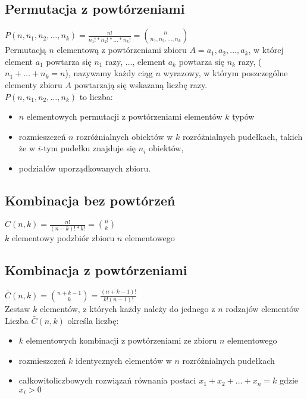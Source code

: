 \documentclass[a4paper,12pt]{article}
\begin{document}
\subsection{Permutacja z powtórzeniami} $P(n,n_1,n_2,\dots ,n_k)=\frac{n!}{n_1!*n_2!*\dots *n_k!}= {{n}\choose{n_1,n_2,\dots, n_k}}$ \\
Permutacją $n$ elementową z powtórzeniami zbioru  $A=a_1,a_2,\dots,a_k$, w której element $a_1$ powtarza się $n_1$ razy, $\dots$, element $a_k$ powtarza się $n_k$ razy, ($n_1+ \dots + n_k= n$), nazywamy każdy ciąg $n$ wyrazowy, w którym poszczególne elementy zbioru $A$ powtarzają się wskazaną liczbę razy.\\

$P(n,n_1,n_2,\dots ,n_k)$ to liczba: 
\begin{itemize} \itemsep1pt \parskip0pt 
 \item $n$ elementowych permutacji z powtórzeniami elementów $k$ typów
 \item rozmieszczeń $n$ rozróżnialnych obiektów w $k$ rozróżnialnych pudełkach, takich że w $i$-tym pudełku znajduje się $n_i$ obiektów,
 \item podziałów uporządkowanych zbioru.
\end{itemize}
\subsection{Kombinacja bez powtórzeń} $C(n,k)=\frac{n!}{(n-k)!*k!}={{n}\choose{k}}$ \\
$k$ elementowy podzbiór zbioru $n$ elementowego 
\subsection{Kombinacja z powtórzeniami} $\bar C(n,k)={{n+k-1}\choose{k}}=\frac{(n+k-1)!}{k!(n-1)!}$ \\
Zestaw $k$ elementów, z których każdy należy do jednego z $n$ rodzajów elementów
Liczba $\bar C(n,k)$ określa liczbę:
\begin{itemize} \itemsep1pt \parskip0pt 
 \item $k$ elementowych kombinacji z powtórzeniami ze zbioru $n$ elementowego
 \item rozmieszczeń $k$ identycznych elementów w $n$ rozróżnialnych pudełkach
 \item całkowitoliczbowych rozwiązań równania postaci $x_1+x_2+\dots +x_n=k$ gdzie $x_i>0$
\end{itemize}
\end{document}
